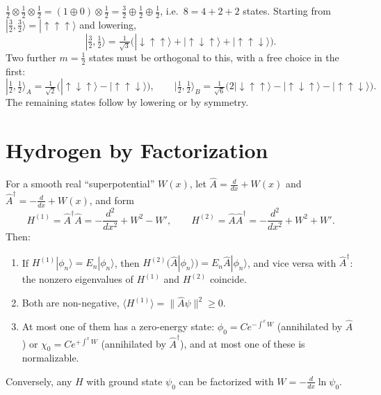 \begin{example}
$\frac12\otimes\frac12\otimes\frac12 = (1\oplus0)\otimes\frac12 = \frac32\oplus\frac12\oplus\frac12$, i.e.\ $8 = 4+2+2$ states. Starting from $|\tfrac32,\tfrac32\rangle = |{\uparrow\uparrow\uparrow}\rangle$ and lowering,
\[
    |\tfrac32,\tfrac12\rangle = \tfrac{1}{\sqrt3}\bigl(|{\downarrow\uparrow\uparrow}\rangle + |{\uparrow\downarrow\uparrow}\rangle + |{\uparrow\uparrow\downarrow}\rangle\bigr).
\]
Two further $m = \frac12$ states must be orthogonal to this, with a free choice in the first:
\[
    |\tfrac12,\tfrac12\rangle_A = \tfrac{1}{\sqrt2}\bigl(|{\uparrow\downarrow\uparrow}\rangle - |{\uparrow\uparrow\downarrow}\rangle\bigr),
    \qquad
    |\tfrac12,\tfrac12\rangle_B = \tfrac{1}{\sqrt6}\bigl(2|{\downarrow\uparrow\uparrow}\rangle - |{\uparrow\downarrow\uparrow}\rangle - |{\uparrow\uparrow\downarrow}\rangle\bigr).
\]
The remaining states follow by lowering or by symmetry.
\end{example}

\section{Hydrogen by Factorization}

\begin{theorem}
For a smooth real ``superpotential'' $W(x)$, let $\hat{A} = \frac{d}{dx} + W(x)$ and $\hat{A}^\dagger = -\frac{d}{dx} + W(x)$, and form
\[
    H^{(1)} = \hat{A}^\dagger\hat{A} = -\frac{d^2}{dx^2} + W^2 - W',
    \qquad
    H^{(2)} = \hat{A}\hat{A}^\dagger = -\frac{d^2}{dx^2} + W^2 + W'.
\]
Then:
\begin{enumerate}
    \item If $H^{(1)}|\phi_n\rangle = E_n|\phi_n\rangle$, then $H^{(2)}(\hat{A}|\phi_n\rangle) = E_n\hat{A}|\phi_n\rangle$, and vice versa with $\hat{A}^\dagger$: the nonzero eigenvalues of $H^{(1)}$ and $H^{(2)}$ coincide.
    \item Both are non-negative, $\langle H^{(1)}\rangle = \|\hat{A}\psi\|^2\ge0$.
    \item At most one of them has a zero-energy state: $\phi_0 = Ce^{-\int^xW}$ (annihilated by $\hat{A}$) or $\chi_0 = Ce^{+\int^xW}$ (annihilated by $\hat{A}^\dagger$), and at most one of these is normalizable.
\end{enumerate}
Conversely, any $H$ with ground state $\psi_0$ can be factorized with $W = -\frac{d}{dx}\ln\psi_0$.
\end{theorem}

